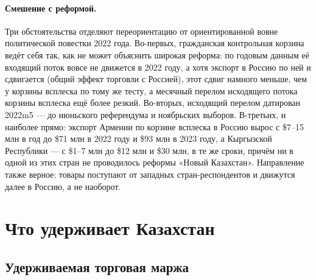 \documentclass[12pt]{article}
\begin{document}
\paragraph{Смешение с реформой.} Три обстоятельства отделяют переориентацию от
ориентированной вовне политической повестки 2022 года. Во-первых, гражданская контрольная
корзина ведёт себя так, как не может объяснить широкая реформа: по годовым данным её
входящий поток вовсе не движется в 2022 году, а хотя экспорт в Россию по ней и сдвигается
(общий эффект торговли с Россией), этот сдвиг намного меньше, чем у корзины всплеска по тому
же тесту, а месячный перелом исходящего потока корзины всплеска ещё более резкий. Во-вторых,
исходящий перелом датирован 2022m5 — до июньского референдума и ноябрьских выборов.
В-третьих, и наиболее прямо: экспорт Армении по корзине всплеска в Россию вырос с
\$7--15 млн в год до \$71 млн в 2022 году и \$93 млн в 2023 году, а Кыргызской Республики —
с \$1--7 млн до \$12 млн и \$30 млн, в те же сроки, причём ни в одной из этих стран не
проводилось реформы «Новый Казахстан». Направление также верное: товары поступают от
западных стран-респондентов и движутся далее в Россию, а не наоборот.

\section{Что удерживает Казахстан}\label{sec:capture}

\subsection{Удерживаемая торговая маржа}
\end{document}
